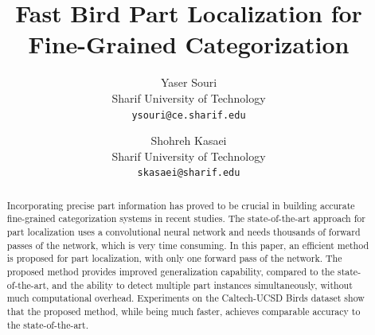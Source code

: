 \documentclass[10pt,twocolumn,letterpaper]{article}
\begin{document}
\title{Fast Bird Part Localization for Fine-Grained Categorization}

\author{Yaser Souri\\
Sharif University of Technology\\
{\tt\small ysouri@ce.sharif.edu}
\and
Shohreh Kasaei\\
Sharif University of Technology\\
{\tt\small skasaei@sharif.edu}
}

\maketitle


\begin{abstract}
Incorporating precise part information has proved to be crucial in building accurate fine-grained categorization systems in recent studies. The state-of-the-art approach for part localization uses a convolutional neural network and needs thousands of forward passes of the network, which is very time consuming. In this paper, an efficient method is proposed for part localization, with only one forward pass of the network. The proposed method provides improved generalization capability, compared to the state-of-the-art, and the ability to detect multiple part instances simultaneously, without much computational overhead. Experiments on the Caltech-UCSD Birds dataset show that the proposed method, while being much faster, achieves comparable accuracy to the state-of-the-art.
\end{abstract}
\end{document}
